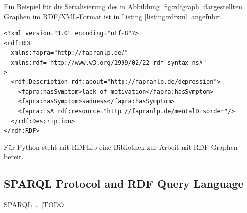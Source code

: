 Ein Beispiel für die Serialisierung des in Abbildung \ref{fig:rdfgraph} dargestellten Graphen im RDF/XML-Format ist in Listing \ref{listing:rdfxml} angeführt.

\lstset{language=XML, caption=RDF/XML, label=listing:rdfxml}
\begin{lstlisting}
<?xml version="1.0" encoding="utf-8"?>
<rdf:RDF
  xmlns:fapra="http://fapranlp.de/"
  xmlns:rdf="http://www.w3.org/1999/02/22-rdf-syntax-ns#"
>
  <rdf:Description rdf:about="http://fapranlp.de/depression">
    <fapra:hasSymptom>lack of motivation</fapra:hasSymptom>
    <fapra:hasSymptom>sadness</fapra:hasSymptom>
    <fapra:isA rdf:resource="http://fapranlp.de/mentalDisorder"/>
  </rdf:Description>
</rdf:RDF>
\end{lstlisting}




Für Python steht mit RDFLib \cite{rdflib_team_rdflib_2022} eine Bibliothek zur Arbeit mit RDF-Graphen bereit.

\subsection{SPARQL Protocol and RDF Query Language}
SPARQL \dots{} [TODO]